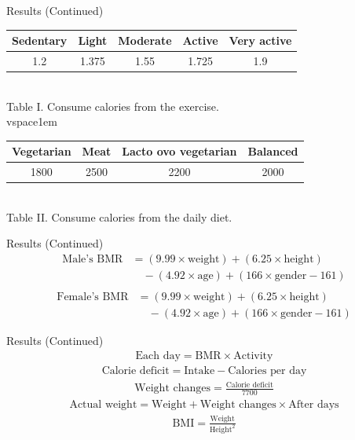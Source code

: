 \documentclass[fleqn]{beamer}
\begin{document}
\begin{frame}{Results (Continued)}
\vspace{2em}
\sloppy
\renewcommand{\arraystretch}{1.35}
\centering
\begin{tabular}{|c|c|c|c|c|}
\hline
Sedentary & Light & Moderate & Active & Very active \\
\hline
1.2 & 1.375 & 1.55 & 1.725 & 1.9 \\
\hline
\end{tabular}
\vspace{1em} \\
Table I. Consume calories from the exercise. 
\\vspace{1em} \\
\begin{tabular}{|c|c|c|c|}
\hline
Vegetarian & Meat & Lacto ovo vegetarian & Balanced \\
\hline
1800 & 2500 & 2200 & 2000 \\
\hline
\end{tabular}
\vspace{1em} \\
Table II. Consume calories from the daily diet. 
\vspace{1em} \\
\end{frame}
\begin{frame}{Results (Continued)}
\sloppy
\begin{align*}
\text{Male's BMR} &= (9.99 \times \text{weight}) + (6.25 \times \text{height}) \\
&\quad - (4.92 \times \text{age}) + (166 \times \text{gender} - 161) \\
\end{align*}
\begin{align*}
\text{Female's BMR} &= (9.99 \times \text{weight}) + (6.25 \times \text{height}) \\
&\quad - (4.92 \times \text{age}) + (166 \times \text{gender} - 161)
\end{align*}
\end{frame}
\begin{frame}{Results (Continued)}
\sloppy
\begin{align*}
\text{Each day} = \text{BMR} \times \text{Activity}
\end{align*}
\begin{align*}
\text{Calorie deficit} = \text{Intake} - \text{Calories per day}
\end{align*}
\begin{align*}
\text{Weight changes} = \frac{\text{Calorie deficit}}{7700} 
\end{align*}
\begin{align*}
\text{Actual weight}= \text{Weight} + \text{Weight changes} \times \text{After days}
\end{align*}
\begin{align*}
\text{BMI} = \frac{\text{Weight}}{\text{Height}^2}
\end{align*}
\end{frame}
\end{document}
